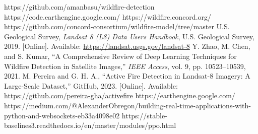 \documentclass[conference]{IEEEtran}
\begin{document}
\vspace{0.4cm}
\begin{thebibliography}{00}
 https://github.com/amanbasu/wildfire-detection
 https://code.earthengine.google.com/
 https://wildfire.concord.org/
 https://github.com/concord-consortium/wildfire-model/tree/master
 U.S. Geological Survey, \emph{Landsat 8 (L8) Data Users Handbook}, U.S. Geological Survey, 2019. [Online]. Available: \url{https://landsat.usgs.gov/landsat-8}
 Y. Zhao, M. Chen, and S. Kumar, ``A Comprehensive Review of Deep Learning Techniques for Wildfire Detection in Satellite Images,'' \emph{IEEE Access}, vol. 9, pp. 10523--10539, 2021.
 M. Pereira and G. H. A., ``Active Fire Detection in Landsat-8 Imagery: A Large-Scale Dataset,'' GitHub, 2023. [Online]. Available: \url{https://github.com/pereira-gha/activefire}
 https://earthengine.google.com/
 https://medium.com/@AlexanderObregon/building-real-time-applications-with-python-and-websockets-eb33a4098e02
 https://stable-baselines3.readthedocs.io/en/master/modules/ppo.html
\end{thebibliography}
\end{document}
